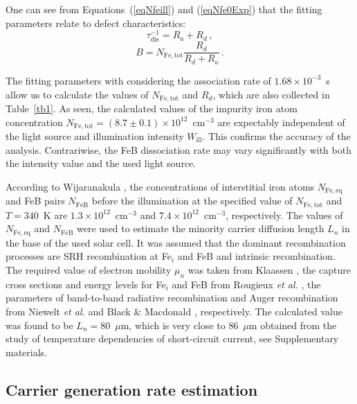 \documentclass{WileyMSP-template}
\begin{document}
One can see from Equations~(\ref{eqNfeill}) and (\ref{eqNfe0Exp}) that
the fitting parameters relate to defect characteristics:
\begin{equation}
\label{eqTauRd}
\tau_\mathrm{dis}^{-1}=R_a+R_d\,,
\end{equation}
\begin{equation}
\label{eqFefit}
B=N_\mathrm{Fe,tot}\frac{R_d}{R_d+R_a}\,.
\end{equation}

The fitting parameters
with considering the association rate of $1.68\times10^{-3}$~s allow us
to calculate the values of $N_\mathrm{Fe,tot}$ and $R_d$, which are also collected in Table~\ref{tb1}.
As seen, the calculated values of the impurity iron atom concentration
$N_\mathrm{Fe,tot}=(8.7\pm0.1)\times10^{12}$~cm$^{-3}$ are expectably independent of the light source and illumination intensity $W_\mathrm{ill}$.
This confirms the accuracy of the analysis.
Contrariwise, the FeB dissociation rate may vary significantly with both the intensity value and the used light source.

According to Wijaranakula \cite{FeB:kinetic}, the concentrations of interstitial iron atoms $N_\mathrm{Fe,eq}$ and FeB pairs
$N_\mathrm{FeB}$ before the illumination at the specified value of $N_\mathrm{Fe,tot}$ and $T=340$~K are $1.3\times10^{12}$~cm$^{-3}$ and $7.4\times10^{12}$~cm$^{-3}$, respectively.
The values of $N_\mathrm{Fe,eq}$ and $N_\mathrm{FeB}$ were used to estimate the minority carrier diffusion length $L_n$
in the base of the used solar cell.
It was assumed that the dominant recombination processes are SRH recombination at Fe$_i$ and FeB and intrinsic recombination.
The required value of electron mobility $\mu_n$ was taken from Klaassen \cite{KLAASSEN953},
the capture cross sections and energy levels for Fe$_i$ and FeB from Rougieux \emph{et al.} \cite{ROUGIEUX2018},
the parameters of band-to-band radiative recombination and Auger recombination from
Niewelt \emph{et al.} \cite{Brad2022} and Black \& Macdonald \cite{AugerSi2022}, respectively.
The calculated value was found to be $L_n=80$~$\mu$m,
which is very close to 86~$\mu$m  obtained from the study of temperature dependencies of short-circuit current, see Supplementary materials.

\subsection{Carrier generation rate estimation}\label{SecG}
\end{document}
